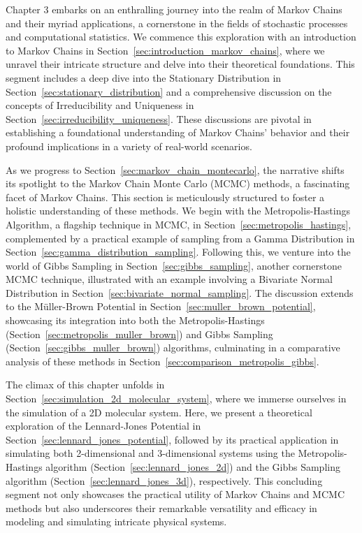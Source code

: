 \documentclass{report}
\begin{document}
Chapter 3 embarks on an enthralling journey into the realm of Markov Chains and their myriad applications, a cornerstone in the fields of stochastic processes and computational statistics. We commence this exploration with an introduction to Markov Chains in Section~\ref{sec:introduction_markov_chains}, where we unravel their intricate structure and delve into their theoretical foundations. This segment includes a deep dive into the Stationary Distribution in Section~\ref{sec:stationary_distribution} and a comprehensive discussion on the concepts of Irreducibility and Uniqueness in Section~\ref{sec:irreducibility_uniqueness}. These discussions are pivotal in establishing a foundational understanding of Markov Chains' behavior and their profound implications in a variety of real-world scenarios.

As we progress to Section~\ref{sec:markov_chain_montecarlo}, the narrative shifts its spotlight to the Markov Chain Monte Carlo (MCMC) methods, a fascinating facet of Markov Chains. This section is meticulously structured to foster a holistic understanding of these methods. We begin with the Metropolis-Hastings Algorithm, a flagship technique in MCMC, in Section~\ref{sec:metropolis_hastings}, complemented by a practical example of sampling from a Gamma Distribution in Section~\ref{sec:gamma_distribution_sampling}. Following this, we venture into the world of Gibbs Sampling in Section~\ref{sec:gibbs_sampling}, another cornerstone MCMC technique, illustrated with an example involving a Bivariate Normal Distribution in Section~\ref{sec:bivariate_normal_sampling}. The discussion extends to the Müller-Brown Potential in Section~\ref{sec:muller_brown_potential}, showcasing its integration into both the Metropolis-Hastings (Section~\ref{sec:metropolis_muller_brown}) and Gibbs Sampling (Section~\ref{sec:gibbs_muller_brown}) algorithms, culminating in a comparative analysis of these methods in Section~\ref{sec:comparison_metropolis_gibbs}.

The climax of this chapter unfolds in Section~\ref{sec:simulation_2d_molecular_system}, where we immerse ourselves in the simulation of a 2D molecular system. Here, we present a theoretical exploration of the Lennard-Jones Potential in Section~\ref{sec:lennard_jones_potential}, followed by its practical application in simulating both 2-dimensional and 3-dimensional systems using the Metropolis-Hastings algorithm (Section~\ref{sec:lennard_jones_2d}) and the Gibbs Sampling algorithm (Section~\ref{sec:lennard_jones_3d}), respectively. This concluding segment not only showcases the practical utility of Markov Chains and MCMC methods but also underscores their remarkable versatility and efficacy in modeling and simulating intricate physical systems.
\end{document}

